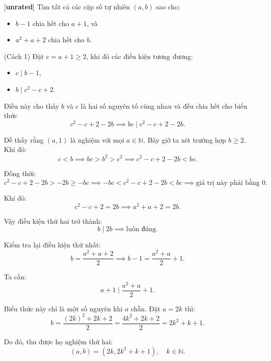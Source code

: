 \documentclass[../01-divisibility.tex]{subfiles}
\begin{document}
\begin{example*}\label{example:RUS-2015-TST-D9-P1}[\textbf{unrated}]
	Tìm tất cả các cặp số tự nhiên $(a,b)$ sao cho:
	\begin{itemize}[topsep=0pt, partopsep=0pt, itemsep=0pt]
		\item $b - 1$ chia hết cho $a + 1$, và
		\item $a^2 + a + 2$ chia hết cho $b$.
	\end{itemize}
\end{example*}

\begin{soln}(Cách 1)\footnotemark
	Đặt $c = a + 1 \ge 2$, khi đó các điều kiện tương đương:
	\begin{itemize}[topsep=0pt, partopsep=0pt, itemsep=0pt]
		\item $c \mid b - 1$,
		\item $b \mid c^2 - c + 2$.
	\end{itemize}

	Điều này cho thấy $b$ và $c$ là hai số nguyên tố cùng nhau và đều chia hết cho biểu thức
	\[
		c^2 - c + 2 - 2b \implies bc \mid c^2 - c + 2 - 2b.
	\]
	
	Dễ thấy rằng $\boxed{(a, 1)}$ là nghiệm với mọi $a \in \mathbb{N}$. Bây giờ ta xét trường hợp $b \ge 2$. Khi đó:
	\[
		c < b \implies bc > b^2 > c^2 \implies c^2 - c + 2 - 2b < bc.
	\]

	Đồng thời:
	\[
		c^2 - c + 2 - 2b > -2b \ge -bc \implies -bc < c^2 - c + 2 - 2b < bc \implies \text{giá trị này phải bằng 0}.
	\]

	Khi đó:
	\[
		c^2 - c + 2 = 2b \implies a^2 + a + 2 = 2b.
	\]

	Vậy điều kiện thứ hai trở thành:
	\[
		b \mid 2b \implies \text{luôn đúng}.
	\]

	Kiểm tra lại điều kiện thứ nhất:
	\[
		b = \frac{a^2 + a + 2}{2} \implies b - 1 = \frac{a^2 + a}{2} + 1.
	\]

	Ta cần:
	\[
		a + 1 \mid \frac{a^2 + a}{2} + 1.
	\]

	Biểu thức này chỉ là một số nguyên khi $a$ chẵn. Đặt $a = 2k$ thì:
	\[
		b = \frac{(2k)^2 + 2k + 2}{2} = \frac{4k^2 + 2k + 2}{2} = 2k^2 + k + 1.
	\]

	Do đó, thu được họ nghiệm thứ hai:
	\[
		\boxed{(a, b) = (2k, 2k^2 + k + 1), \quad k \in \mathbb{N}}.
	\]
\end{soln}

\end{document}
